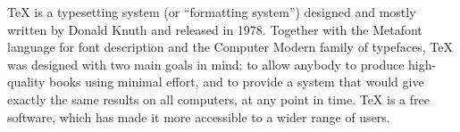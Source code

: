 \documentclass[12pt]{article}
\begin{document}
\noindent TeX is a typesetting system (or ``formatting system'') designed and
mostly written by Donald Knuth and released in 1978. Together with the Metafont
language for font description and the Computer Modern family of typefaces, TeX
was designed with two main goals in mind: to allow anybody to produce
high-quality books using minimal effort, and to provide a system that would
give exactly the same results on all computers, at any point in time. TeX is a
free software, which has made it more accessible to a wider range of users.
\end{document}
